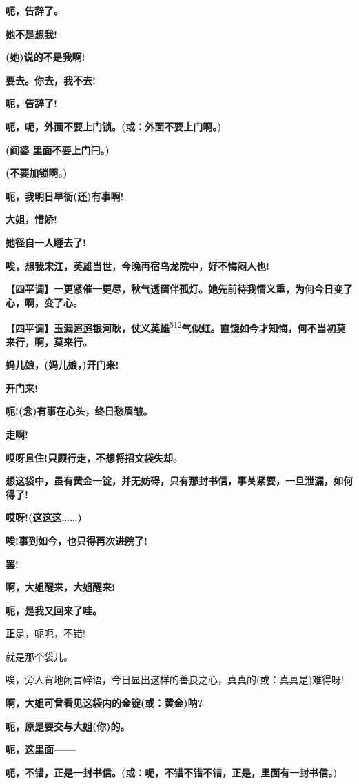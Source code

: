\textbf{呃，告辞了。}

\textbf{她不是想我!}

\textbf{(她)说的不是我啊!}

\textbf{要去。你去，我不去!}

\textbf{呃，告辞了!}

\textbf{呃，呃，外面不要上门锁。(或：外面不要上门啊。)}

\textbf{(阎婆 里面不要上门闩。)}

\textbf{(不要加锁啊。)}

\textbf{呃，我明日早衙(还)有事啊!}

\textbf{大姐，惜娇!}

\textbf{她径自一人睡去了!}

\textbf{唉，想我宋江，英雄当世，今晚再宿乌龙院中，好不悔闷人也!}

\textbf{【四平调】一更紧催一更尽，秋气透窗伴孤灯。她先前待我情义重，为何今日变了心，啊，变了心。}

\textbf{【四平调】玉漏迢迢银河耿，仗义英雄}\protect\hyperlink{fn512}{\textsuperscript{512}}\textbf{气似虹。直饶如今才知悔，何不当初莫来行，啊，莫来行。}

\textbf{妈儿娘，(妈儿娘，)开门来!}

\textbf{开门来!}

\textbf{呃!(念)有事在心头，终日愁眉皱。}

\textbf{走啊!}

\textbf{哎呀且住!只顾行走，不想将招文袋失却。}

\textbf{想这袋中，虽有黄金一锭，并无妨碍，只有那封书信，事关紧要，一旦泄漏，如何得了!}

\textbf{哎呀!(这这这\ldots{}\ldots{})}

\textbf{唉!事到如今，也只得再次进院了!}

\textbf{罢!}

\textbf{啊，大姐醒来，大姐醒来!}

\textbf{呃，是我又回来了哇。}

\textbf{正}是，呃呃，不错!

就是那个袋儿。

唉，旁人背地闲言碎语，今日显出这样的善良之心，真真的(或：真真是)难得呀!

\textbf{啊，大姐可曾看见这袋内的金锭(或：黄金)呐?}

\textbf{呃，原是要交与大姐(你)的。}

\textbf{呃，这里面------}

\textbf{呃，不错，正是一封书信。(或：呃，不错不错不错，正是，里面有一封书信。)}


